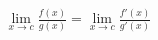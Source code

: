 \documentclass[preview]{standalone}
\begin{document}
\begin{align*}
\lim_{x \to c} \frac{f(x)}{g(x)} = \lim_{x \to c} \frac{f'(x)}{g'(x)}
\end{align*}
\end{document}

